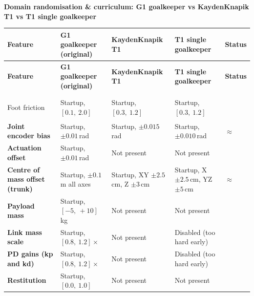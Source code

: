 \documentclass[a4paper,10pt]{article}
\newcommand{\cmark}{\ding{51}}   %
\newcommand{\xmark}{\ding{55}}   %
\newcommand{\wmark}{$\approx$}   %
\begin{document}
\begin{center}
{\large\bfseries Domain randomisation \& curriculum: G1 goalkeeper vs KaydenKnapik T1 vs T1 single goalkeeper}
\end{center}

\vspace{4pt}

{\small
\begin{longtable}{>{\bfseries}p{3.6cm} p{3.4cm} p{3.4cm} p{3.4cm} p{1.2cm}}
\toprule
\textbf{Feature} & \textbf{G1 goalkeeper (original)} & \textbf{KaydenKnapik T1} & \textbf{T1 single goalkeeper} & \textbf{Status} \\
\midrule
\endfirsthead
\toprule
\textbf{Feature} & \textbf{G1 goalkeeper (original)} & \textbf{KaydenKnapik T1} & \textbf{T1 single goalkeeper} & \textbf{Status} \\
\midrule
\endhead
\bottomrule
\endfoot

\rowcolor{sectionbg}
\multicolumn{5}{l}{\textcolor{white}{\textbf{Domain randomisation events}}} \\
\midrule

Foot friction
  & Startup, $[0.1,\ 2.0]$
  & Startup, $[0.3,\ 1.2]$
  & Startup, $[0.3,\ 1.2]$
  & \cmark \\

Joint encoder bias
  & Startup, $\pm0.01$\,rad
  & Startup, $\pm0.015$\,rad
  & Startup, $\pm0.010$\,rad
  & \wmark \\

Actuation offset
  & Startup, $\pm0.01$\,rad
  & Not present
  & Not present
  & \xmark \\

Centre of mass offset (trunk)
  & Startup, $\pm0.1$\,m all axes
  & Startup, XY $\pm2.5$\,cm, Z $\pm3$\,cm
  & Startup, X $\pm2.5$\,cm, YZ $\pm5$\,cm
  & \wmark \\

Payload mass
  & Startup, $[-5,\ +10]$\,kg
  & Not present
  & Not present
  & \xmark \\

Link mass scale
  & Startup, $[0.8,\ 1.2]\times$
  & Not present
  & Disabled (too hard early)
  & \xmark \\

PD gains (kp and kd)
  & Startup, $[0.8,\ 1.2]\times$
  & Not present
  & Disabled (too hard early)
  & \xmark \\

Restitution
  & Startup, $[0.0,\ 1.0]$
  & Not present
  & Not present
  & \xmark \\


\end{longtable}}
\end{document}
